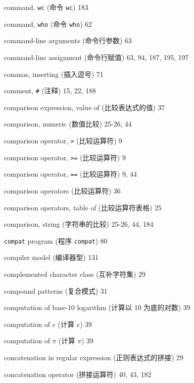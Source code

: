 \begin{multicols}{3}
\hangindent=3pc  command, \verb'wc' (命令 \verb'wc') 183


\hangindent=3pc  command, \verb'who' (命令 \verb'who') 62

\hangindent=3pc  command-line arguments (命令行参数) 63

\hangindent=3pc  command-line assignment (命令行赋值)
63, 94, 187, 195, 197

\hangindent=3pc  commas, inserting (插入逗号) 71

\hangindent=3pc  comment, \verb'#' (注释) 15, 22, 188

\hangindent=3pc  comparison expression, value of
(比较表达式的值) 37

\hangindent=3pc  comparison, numeric (数值比较) 25-26, 44

\hangindent=3pc  comparison operator, \verb'>' (比较运算符) 9

\hangindent=3pc  comparison operator, \verb'>=' (比较运算符) 9

\hangindent=3pc  comparison operator, \verb'==' (比较运算符) 9, 44

\hangindent=3pc  comparison operators (比较运算符) 36

\hangindent=3pc  comparison operators, table of (比较运算符表格) 25

\hangindent=3pc  comparison, string (字符串的比较) 25-26, 44, 184

\hangindent=3pc  \verb'compat' program (程序 \verb'compat') 80

\hangindent=3pc  compiler model (编译器型) 131

\hangindent=3pc  complemented character class (互补字符集) 29

\hangindent=3pc  compound patterns (复合模式) 31

\hangindent=3pc  computation of base-10 logarithm (计算以 10
为底的对数) 39

\hangindent=3pc  computation of $e$ (计算 $e$) 39

\hangindent=3pc  computation of $\pi$ (计算 $\pi$) 39

\hangindent=3pc  concatenation in regular expression
(正则表达式的拼接) 29

\hangindent=3pc  concatenation operator (拼接运算符) 40, 43, 182


\end{multicols}
